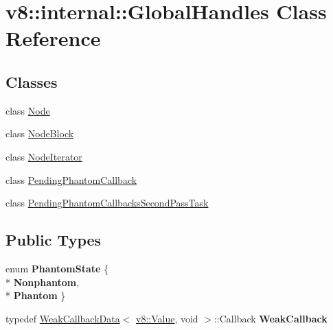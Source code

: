 \hypertarget{classv8_1_1internal_1_1_global_handles}{}\section{v8\+:\+:internal\+:\+:Global\+Handles Class Reference}
\label{classv8_1_1internal_1_1_global_handles}
\subsection*{Classes}
\begin{DoxyCompactItemize}
\item 
class \hyperlink{classv8_1_1internal_1_1_global_handles_1_1_node}{Node}
\item 
class \hyperlink{classv8_1_1internal_1_1_global_handles_1_1_node_block}{Node\+Block}
\item 
class \hyperlink{classv8_1_1internal_1_1_global_handles_1_1_node_iterator}{Node\+Iterator}
\item 
class \hyperlink{classv8_1_1internal_1_1_global_handles_1_1_pending_phantom_callback}{Pending\+Phantom\+Callback}
\item 
class \hyperlink{classv8_1_1internal_1_1_global_handles_1_1_pending_phantom_callbacks_second_pass_task}{Pending\+Phantom\+Callbacks\+Second\+Pass\+Task}
\end{DoxyCompactItemize}
\subsection*{Public Types}
\begin{DoxyCompactItemize}
\item 
enum {\bfseries Phantom\+State} \{ \\*
{\bfseries Nonphantom}, 
\\*
{\bfseries Phantom}
 \}\hypertarget{classv8_1_1internal_1_1_global_handles_a6c79e75b15ba6bd20e910510abf8cb29}{}\label{classv8_1_1internal_1_1_global_handles_a6c79e75b15ba6bd20e910510abf8cb29}

\item 
typedef \hyperlink{classv8_1_1_weak_callback_data}{Weak\+Callback\+Data}$<$ \hyperlink{classv8_1_1_value}{v8\+::\+Value}, void $>$\+::Callback {\bfseries Weak\+Callback}\hypertarget{classv8_1_1internal_1_1_global_handles_a0c98914e97d88cdc693a1ab28d472728}{}\label{classv8_1_1internal_1_1_global_handles_a0c98914e97d88cdc693a1ab28d472728}

\end{DoxyCompactItemize}
